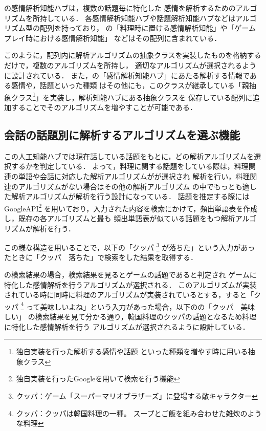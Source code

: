 
の感情解析知能ハブは，複数の話題毎に特化した
感情を解析するためのアルゴリズムを所持している．
各感情解析知能ハブや話題解析知能ハブなどはアルゴリズム型の配列を持っており，
の「料理時に置ける感情解析知能」や「ゲームプレイ時における感情解析知能」
などはその配列に含まれている．

このように，配列内に解析アルゴリズムの抽象クラスを実装したものを格納するだけで，複数のアルゴリズムを所持し，
適切なアルゴリズムが選択されるように設計されている．
また，の「感情解析知能ハブ」にあたる解析する情報である感情や，話題といった種類
はその他にも，このクラスが継承している「親抽象クラス\footnote{独自実装を行った解析する感情や話題
といった種類を増やす時に用いる抽象クラス}」を実装し，解析知能ハブにある抽象クラスを
保存している配列に追加することでそのアルゴリズムを増やすことが可能である．

\subsection{会話の話題別に解析するアルゴリズムを選ぶ機能}
この人工知能ハブでは現在話している話題をもとに，どの解析アルゴリズムを選択するかを判定している．
よって，料理に関する話題をしている際は，料理関連の単語や会話に対応した解析アルゴリズムがが選択され
解析を行い，料理関連のアルゴリズムがない場合はその他の解析アルゴリズム
の中でもっとも適した解析アルゴリズムが解析を行う設計になっている．
話題を推定する際にはGoogleAPI\footnote{独自実装を行ったGoogleを用いて検索を行う機能}
を用いており，入力された内容を検索にかけて，頻出単語表を作成し，既存の各アルゴリズムと最も
頻出単語表が似ている話題をもつ解析アルゴリズムが解析を行う．

この様な構造を用いることで，以下の「クッパ
	\footnote{クッパ：ゲーム「スーパーマリオブラザーズ」に登場する敵キャラクター}
が落ちた」という入力があったときに「クッパ　落ちた」で検索をした結果を取得する．


の検索結果の場合，検索結果を見るとゲームの話題であると判定され
ゲームに特化した感情解析を行うアルゴリズムが選択される．
このアルゴリズムが実装されている時に同時に料理のアルゴリズムが実装されているとする，すると「クッパ
\footnote{クッパ：クッパは韓国料理の一種。 スープとご飯を組み合わせた雑炊のような料理}
って美味しいよね」という入力があった場合，以下のの「クッパ　美味しい」
の検索結果を見て分かる通り，韓国料理のクッパの話題となるため料理に特化した感情解析を行う
アルゴリズムが選択されるように設計している．

